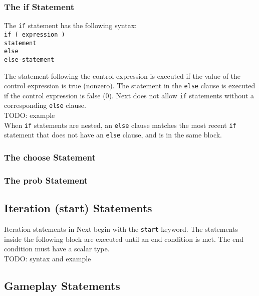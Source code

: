 \documentclass[12pt]{article}
\begin{document}
\subsubsection{The if Statement}

The \texttt{if} statement has the following syntax: \\

\texttt{if ( expression ) \\
\indent \indent statement \\
\indent else \\
\indent \indent else-statement \\
}

\noindent The statement following the control expression is executed if the value of the control expression is true (nonzero).  The statement in the \texttt{else} clause is executed if the control expression is false (0).  Next does not allow \texttt{if} statements without a corresponding \texttt{else} clause.  \\

TODO: example \\

When \texttt{if} statements are nested, an \texttt{else} clause matches the most recent \texttt{if} statement that does not have an \texttt{else} clause, and is in the same block.

\subsubsection{The choose Statement}

\subsubsection{The prob Statement}

\subsection{Iteration (start) Statements}

Iteration statements in Next begin with the \texttt{start} keyword.  The statements inside the following block are executed until an end condition is met.  The end condition must have a scalar type. \\

TODO: syntax and example

\subsection{Gameplay Statements}
\end{document}
